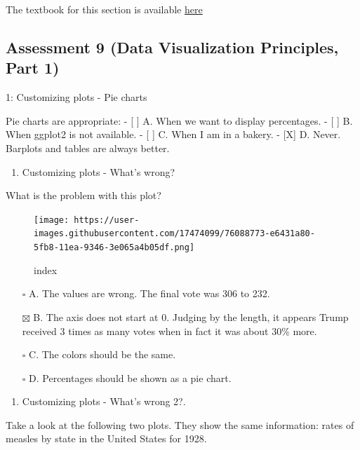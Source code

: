 \documentclass[
]{article}
\providecommand{\tightlist}{%
  \setlength{\itemsep}{0pt}\setlength{\parskip}{0pt}}
\begin{document}
The textbook for this section is available
\href{https://rafalab.github.io/dsbook/data-visualization-principles.html}{here}

\hypertarget{assessment-9-data-visualization-principles-part-1}{%
\subsection{Assessment 9 (Data Visualization Principles, Part
1)}\label{assessment-9-data-visualization-principles-part-1}}

1: Customizing plots - Pie charts

Pie charts are appropriate: - {[} {]} A. When we want to display
percentages. - {[} {]} B. When ggplot2 is not available. - {[} {]} C.
When I am in a bakery. - {[}X{]} D. Never. Barplots and tables are
always better.

\begin{enumerate}
\def\labelenumi{\arabic{enumi}.}
\setcounter{enumi}{1}
\tightlist
\item
  Customizing plots - What's wrong?
\end{enumerate}

What is the problem with this plot?

\begin{figure}
\centering
\texttt{[image: https://user-images.githubusercontent.com/17474099/76088773-e6431a80-5fb8-11ea-9346-3e065a4b05df.png]}
\caption{index}
\end{figure}

\begin{itemize}
\tightlist
\item[$\square$]
  A. The values are wrong. The final vote was 306 to 232.
\item[$\boxtimes$]
  B. The axis does not start at 0. Judging by the length, it appears
  Trump received 3 times as many votes when in fact it was about 30\%
  more.
\item[$\square$]
  C. The colors should be the same.
\item[$\square$]
  D. Percentages should be shown as a pie chart.
\end{itemize}

\begin{enumerate}
\def\labelenumi{\arabic{enumi}.}
\setcounter{enumi}{2}
\tightlist
\item
  Customizing plots - What's wrong 2?.
\end{enumerate}

Take a look at the following two plots. They show the same information:
rates of measles by state in the United States for 1928.
\end{document}
